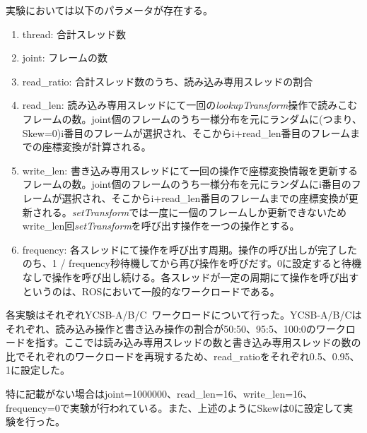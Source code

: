 \documentclass[a4paper]{jreport}	%
\begin{document}
実験においては以下のパラメータが存在する。
\begin{enumerate}
  \item thread: 合計スレッド数
  \item joint: フレームの数
  \item read\_ratio: 合計スレッド数のうち、読み込み専用スレッドの割合
  \item read\_len: 読み込み専用スレッドにて一回の\textit{lookupTransform}操作で読みこむフレームの数。joint個のフレームのうち一様分布を元にランダムに(つまり、Skew=0)i番目のフレームが選択され、そこからi+read\_len番目のフレームまでの座標変換が計算される。
  \item write\_len: 書き込み専用スレッドにて一回の操作で座標変換情報を更新するフレームの数。joint個のフレームのうち一様分布を元にランダムにi番目のフレームが選択され、そこからi+read\_len番目のフレームまでの座標変換が更新される。\textit{setTransform}では一度に一個のフレームしか更新できないためwrite\_len回\textit{setTransform}を呼び出す操作を一つの操作とする。
  \item frequency: 各スレッドにて操作を呼び出す周期。操作の呼び出しが完了したのち、1 / frequency秒待機してから再び操作を呼びだす。0に設定すると待機なしで操作を呼び出し続ける。各スレッドが一定の周期にて操作を呼び出すというのは、ROSにおいて一般的なワークロードである。
\end{enumerate}



各実験はそれぞれYCSB-A/B/C~\cite{ycsb}ワークロードについて行った。YCSB-A/B/Cはそれぞれ、読み込み操作と書き込み操作の割合が50:50、95:5、100:0のワークロードを指す。ここでは読み込み専用スレッドの数と書き込み専用スレッドの数の比でそれぞれのワークロードを再現するため、read\_ratioをそれぞれ0.5、0.95、1に設定した。

特に記載がない場合はjoint=1000000、read\_len=16、write\_len=16、frequency=0で実験が行われている。また、上述のようにSkewは0に設定して実験を行った。
\end{document}
